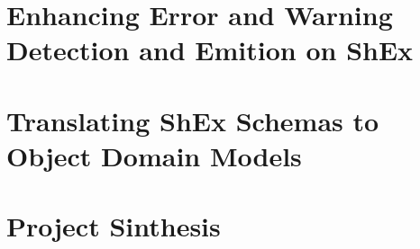 \documentclass[open=any]{SPhdThesis}
\begin{document}
	\begin{frontmatter}
		\SgAddTitle%
		\SgAddToc%
		\SgAddLof%
		\SgAddLot%
	\end{frontmatter}
   
	
	
	

	\part{Enhancing Error and Warning Detection and Emition on ShEx}
	
	

	\part{Translating ShEx Schemas to Object Domain Models}
	
	

	\part{Project Sinthesis}
	
	
	

\end{document}
